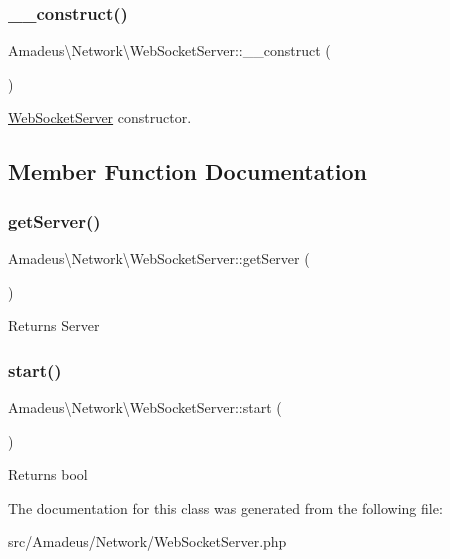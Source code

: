 \subsubsection{\texorpdfstring{\+\_\+\+\_\+construct()}{\_\_construct()}}
{\footnotesize\ttfamily Amadeus\textbackslash{}\+Network\textbackslash{}\+Web\+Socket\+Server\+::\+\_\+\+\_\+construct (\begin{DoxyParamCaption}{ }\end{DoxyParamCaption})}

\hyperlink{classAmadeus_1_1Network_1_1WebSocketServer}{Web\+Socket\+Server} constructor. 

\subsection{Member Function Documentation}
\mbox{\label{classAmadeus_1_1Network_1_1WebSocketServer_a90f0f757540b91a7cb860dd21cb1519a}} 
\subsubsection{\texorpdfstring{get\+Server()}{getServer()}}
{\footnotesize\ttfamily Amadeus\textbackslash{}\+Network\textbackslash{}\+Web\+Socket\+Server\+::get\+Server (\begin{DoxyParamCaption}{ }\end{DoxyParamCaption})}

\begin{DoxyReturn}{Returns}
Server 
\end{DoxyReturn}
\mbox{\label{classAmadeus_1_1Network_1_1WebSocketServer_a1507e1b36260e440137cea054ee84d1d}} 
\subsubsection{\texorpdfstring{start()}{start()}}
{\footnotesize\ttfamily Amadeus\textbackslash{}\+Network\textbackslash{}\+Web\+Socket\+Server\+::start (\begin{DoxyParamCaption}{ }\end{DoxyParamCaption})}

\begin{DoxyReturn}{Returns}
bool 
\end{DoxyReturn}


The documentation for this class was generated from the following file\+:\begin{DoxyCompactItemize}
\item 
src/\+Amadeus/\+Network/Web\+Socket\+Server.\+php\end{DoxyCompactItemize}
